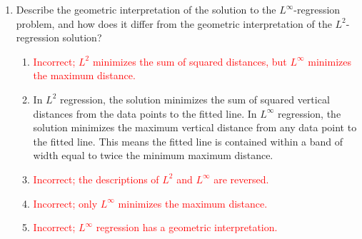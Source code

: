 \documentclass{article}%
\newcommand{\incorrect}[1]{\textcolor{red}{#1}}
\begin{document}
\begin{enumerate}
\begin{enumerate}
\item The $L^2$ problem has a closed-form solution via the normal equations.  The $L^\infty$ problem is typically solved using iterative methods, which can be computationally more expensive, especially for large datasets.%
\item \incorrect{Incorrect; both problems are generally tractable, but $L^\infty$ is often more computationally expensive.}%
\item \incorrect{Incorrect; there is a significant computational difference.}%
\end{enumerate}%
\vspace{1em}%
\item Describe the geometric interpretation of the solution to the $L^\infty$-regression problem, and how does it differ from the geometric interpretation of the $L^2$-regression solution?%
\begin{enumerate}%
\item \incorrect{Incorrect; $L^2$ minimizes the sum of squared distances, but $L^\infty$ minimizes the maximum distance.}%
\item In $L^2$ regression, the solution minimizes the sum of squared vertical distances from the data points to the fitted line. In $L^\infty$ regression, the solution minimizes the maximum vertical distance from any data point to the fitted line.  This means the fitted line is contained within a band of width equal to twice the minimum maximum distance.%
\item \incorrect{Incorrect; the descriptions of $L^2$ and $L^\infty$ are reversed.}%
\item \incorrect{Incorrect; only $L^\infty$ minimizes the maximum distance.}%
\item \incorrect{Incorrect; $L^\infty$ regression has a geometric interpretation.}%
\end{enumerate}%
\vspace{1em}%
\end{enumerate}

%
\end{document}
